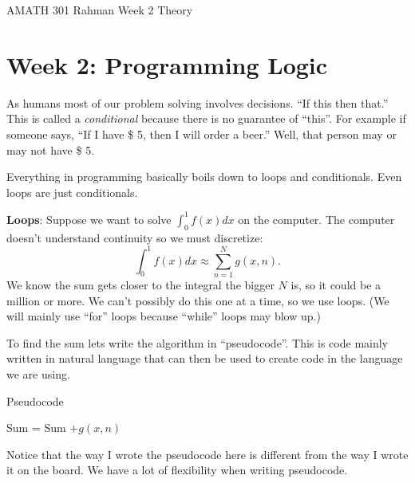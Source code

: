 \documentclass[reqno]{amsart}
\theoremstyle{definition}
\begin{document}
\begin{flushleft}
{\sc \Large AMATH 301 Rahman} \hfill Week 2 Theory
\bigskip
\end{flushleft}

\newcommand{\R}{\mathbb{R}}
\newcommand{\N}{\mathbb{N}}
\newcommand{\Z}{\mathbb{Z}}
\newcommand{\Q}{\mathbb{Q}}
\renewcommand{\CancelColor}{\color{red}}
\newcommand{\?}{\stackrel{?}{=}}
\renewcommand{\varphi}{\phi}
\newcommand{\card}{\text{Card}}
\newcommand{\bigzero}{\text{\Huge 0}}



\section*{Week 2:  Programming Logic}

As humans most of our problem solving involves decisions.  ``If this then that.''  This is called a \emph{conditional} because there is no guarantee of ``this''.  For example if someone says, ``If I have \$ 5, then I will order a beer.''  Well, that person may or may not have \$ 5.

Everything in programming basically boils down to loops and conditionals.  Even loops are just conditionals.

\textbf{Loops}:  Suppose we want to solve $\int_0^1 f(x)dx$ on the computer.  The computer doesn't understand continuity so we must discretize:
%
\begin{equation}
\int_0^1 f(x)dx \approx \sum_{n=1}^N g(x,n).
\end{equation}
%
We know the sum gets closer to the integral the bigger $N$ is, so it could be a million or more.  We can't possibly do this one at a time, so we use loops.  (We will mainly use ``for'' loops because ``while'' loops may blow up.)

To find the sum lets write the algorithm in ``pseudocode''.  This is code mainly written in natural language that can then be used to create code in the language we are using.

\begin{algorithm}
\caption{Pseudocode}
\begin{algorithmic}
\STATE Sum = Sum $+ g(x,n)$
\ENDFOR
\end{algorithmic}
\end{algorithm}

Notice that the way I wrote the pseudocode here is different from the way I wrote it on the board.  We have a lot of flexibility when writing pseudocode.
\end{document}
